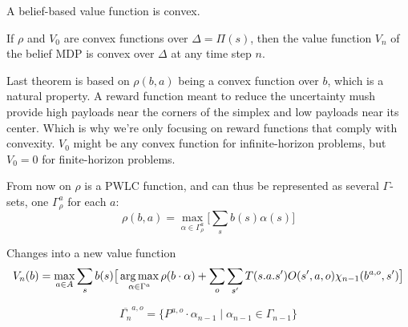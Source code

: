 A belief-based value function is convex. 

If $\rho$ and $V_0$ are convex functions over $\Delta=\Pi(s)$, then the value function $V_n$ of the belief MDP is convex over $\Delta$ at any time step $n$.

Last theorem is based on $\rho(b,a)$ being a convex function over $b$, which is a natural property. A reward function meant to reduce the uncertainty mush provide high payloads near the corners of the simplex and low payloads near its center. Which is why we're only focusing on reward functions that comply with convexity. $V_0$ might be any convex function for infinite-horizon problems, but $V_0=0$ for finite-horizon problems.


From now on $\rho$ is a PWLC function, and can thus be represented as several $\Gamma$-sets, one $\Gamma^a_\rho$ for each $a$:
\begin{equation}
	\rho(b,a)=\max_{\alpha\in\Gamma^a_\rho}\big[\sum_{s}b(s)\alpha(s)\big]
\end{equation}

Changes into a new value function
\begin{equation}
	V_n(b)= \max_{a\in A}\sum_{s}b(s) \big[\operatorname*{arg\,max}_{\alpha\in\Gamma^a} \rho(b\cdot\alpha) + \sum_{o}\sum_{s'}T(s.a.s')O(s',a,o)\chi_{n-1}(b^{a,o},s') \big]
\end{equation}


\begin{equation}
	\overline{\Gamma_n}^{a,o}=\{P^{a,o}\cdot\alpha_{n-1}\mid\alpha_{n-1}\in\Gamma_{n-1}\}
\end{equation}
